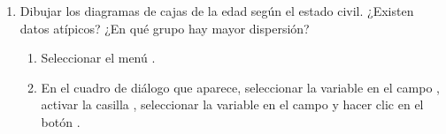 \begin{enumerate}[leftmargin=*]
\begin{enumerate}
\item Dibujar los diagramas de cajas de la edad según el estado civil. ¿Existen datos atípicos? ¿En qué grupo hay mayor
dispersión?
\begin{indicacion}
\begin{enumerate}
\item Seleccionar el menú .
\item En el cuadro de diálogo que aparece, seleccionar la variable  en el campo ,
activar la casilla , seleccionar la variable  en el campo
 y hacer clic en el botón .
\end{enumerate}
\end{indicacion}
\end{enumerate}

\end{enumerate}


